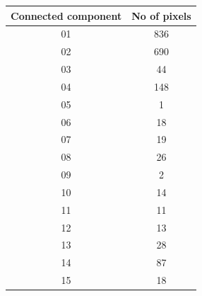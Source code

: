 \begin{center}
\begin{tabular}{c c}
    Connected component & No of pixels \\
    \hline
    01 & 836 \\
    02 & 690 \\
    03 & 44 \\
    04 & 148 \\
    05 & 1 \\
    06 & 18 \\
    07 & 19 \\
    08 & 26 \\
    09 & 2 \\
    10 & 14 \\
    11 & 11 \\
    12 & 13 \\
    13 & 28 \\
    14 & 87 \\
    15 & 18 \\
\end{tabular}
\end{center}
